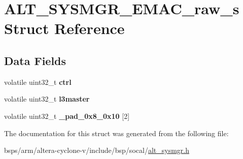 \hypertarget{structALT__SYSMGR__EMAC__raw__s}{}\section{A\+L\+T\+\_\+\+S\+Y\+S\+M\+G\+R\+\_\+\+E\+M\+A\+C\+\_\+raw\+\_\+s Struct Reference}
\label{structALT__SYSMGR__EMAC__raw__s}
\subsection*{Data Fields}
\begin{DoxyCompactItemize}
\item 
\mbox{\label{structALT__SYSMGR__EMAC__raw__s_a7457502594a19f237b4ce449dba31f31}} 
volatile uint32\+\_\+t {\bfseries ctrl}
\item 
\mbox{\label{structALT__SYSMGR__EMAC__raw__s_ac6c38f053e939e9ba7ec0185f414796a}} 
volatile uint32\+\_\+t {\bfseries l3master}
\item 
\mbox{\label{structALT__SYSMGR__EMAC__raw__s_a624f864aabcad9d47156354cc0b89ffa}} 
volatile uint32\+\_\+t {\bfseries \+\_\+pad\+\_\+0x8\+\_\+0x10} \mbox{[}2\mbox{]}
\end{DoxyCompactItemize}


The documentation for this struct was generated from the following file\+:\begin{DoxyCompactItemize}
\item 
bsps/arm/altera-\/cyclone-\/v/include/bsp/socal/\mbox{\hyperlink{alt__sysmgr_8h}{alt\+\_\+sysmgr.\+h}}\end{DoxyCompactItemize}
